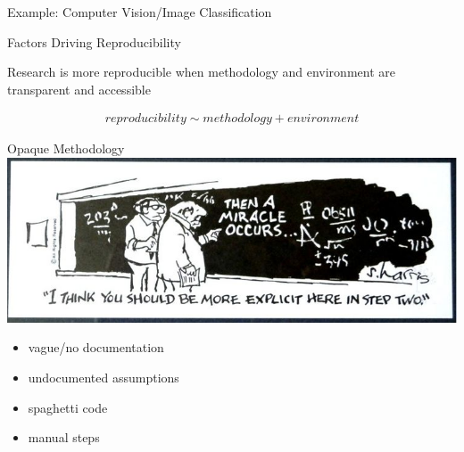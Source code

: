 \documentclass{beamer}
\begin{document}
\begin{frame}{Example: Computer Vision/Image Classification}



\end{frame}


\begin{frame}{Factors Driving Reproducibility}

\centering
Research is more reproducible when methodology and environment 
are \alert{transparent} and \alert{accessible}

\begin{align}
reproducibility \sim methodology + environment
\end{align}

\end{frame}



\begin{frame}{Opaque Methodology}
\includegraphics[width=\linewidth]{images/thenamiracleoccurs}

\begin{itemize}
\item vague/no documentation
\item undocumented assumptions
\item spaghetti code
\item manual steps
\end{itemize}
\end{frame}



%
\end{document}
